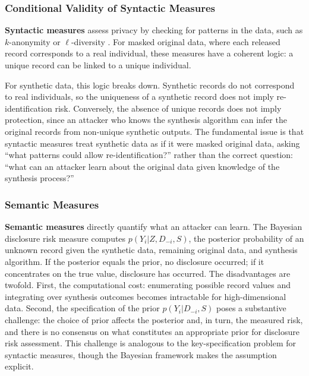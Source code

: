 \documentclass[Afour,sageh,times,doublespace]{sagej}
\begin{document}
\subsubsection{Conditional Validity of Syntactic Measures}

\textbf{Syntactic measures} assess privacy by checking for patterns in the data, such as $k$-anonymity \citep{Sweeney2002} or $\ell$-diversity \citep{Machanavajjhala2007}. For masked original data, where each released record corresponds to a real individual, these measures have a coherent logic: a unique record can be linked to a unique individual.

For synthetic data, this logic breaks down. Synthetic records do not correspond to real individuals, so the uniqueness of a synthetic record does not imply re-identification risk. Conversely, the absence of unique records does not imply protection, since an attacker who knows the synthesis algorithm can infer the original records from non-unique synthetic outputs. The fundamental issue is that syntactic measures treat synthetic data as if it were masked original data, asking ``what patterns could allow re-identification?'' rather than the correct question: ``what can an attacker learn about the original data given knowledge of the synthesis process?''

\subsubsection{Semantic Measures}

\textbf{Semantic measures} directly quantify what an attacker can learn. The Bayesian disclosure risk measure \citep{reiter2014} computes $p(Y_i | Z, D_{-i}, S)$, the posterior probability of an unknown record given the synthetic data, remaining original data, and synthesis algorithm. If the posterior equals the prior, no disclosure occurred; if it concentrates on the true value, disclosure has occurred. The disadvantages are twofold. First, the computational cost: enumerating possible record values and integrating over synthesis outcomes becomes intractable for high-dimensional data. Second, the specification of the prior $p(Y_i | D_{-i}, S)$ poses a substantive challenge: the choice of prior affects the posterior and, in turn, the measured risk, and there is no consensus on what constitutes an appropriate prior for disclosure risk assessment. This challenge is analogous to the key-specification problem for syntactic measures, though the Bayesian framework makes the assumption explicit. 
\end{document}
